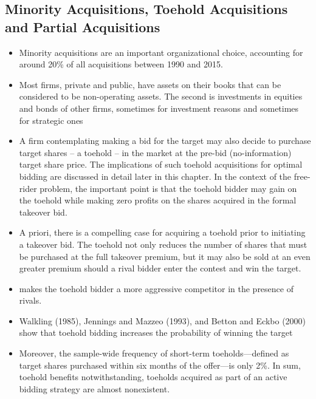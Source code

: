 \documentclass[12pt]{article}
\begin{document}
\subsection{Minority Acquisitions, Toehold Acquisitions and Partial Acquisitions}

    \begin{itemize}

        \item Minority acquisitions are an important organizational choice, accounting for around 20\% of all acquisitions between 1990 and 2015.\citep{huang}

        \item Most firms, private and public, have assets on their books that can be considered to be non-operating assets. The second is investments in equities and bonds of other firms, sometimes for investment reasons and sometimes for strategic ones \citep{Damodaran2005}

        \item A firm contemplating making a bid for the target may also decide to purchase target shares -- a toehold -- in the market at the pre-bid (no-information) target share price. The implications of such toehold acquisitions for optimal bidding are discussed in detail later in this chapter. In the context of the free-rider problem, the important point is that the toehold bidder may gain on the toehold while making zero profits on the shares acquired in the formal takeover bid. \citep{Mitchell2011}

        \item A priori, there is a compelling case for acquiring a toehold prior to initiating a takeover bid. The toehold not only reduces the number of shares that must be purchased at the full takeover premium, but it may also be sold at an even greater premium should a rival bidder enter the contest and win the target. \citep{Mitchell2011}

        \item makes the toehold bidder a more aggressive competitor in the presence of rivals. \citep{Mitchell2011}

        \item Walkling (1985), Jennings and Mazzeo (1993), and Betton and Eckbo (2000) show that toehold bidding increases the probability of winning the target \citep{Mitchell2011}

        \item Moreover, the sample-wide frequency of short-term toeholds—defined as target shares purchased within six months of the offer—is only 2\%. In sum, toehold benefits notwithstanding, toeholds acquired as part of an active bidding strategy are almost nonexistent. \citep{Mitchell2011}


\end{itemize}
\end{document}
